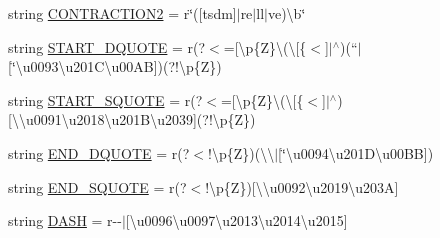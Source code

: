 \begin{DoxyCompactItemize}
\item 
string \hyperlink{classparlai_1_1agents_1_1tfidf__retriever_1_1tokenizers_1_1regexp__tokenizer_1_1RegexpTokenizer_ad05b6da0a1fa16547d923ec8571f4c3f}{C\+O\+N\+T\+R\+A\+C\+T\+I\+O\+N2} = r\char`\"{}\textquotesingle{}(\mbox{[}tsdm\mbox{]}$\vert$re$\vert$ll$\vert$ve)\textbackslash{}b\char`\"{}
\item 
string \hyperlink{classparlai_1_1agents_1_1tfidf__retriever_1_1tokenizers_1_1regexp__tokenizer_1_1RegexpTokenizer_a140d0978b3d372b2e028c674a3493648}{S\+T\+A\+R\+T\+\_\+\+D\+Q\+U\+O\+TE} = r\textquotesingle{}(?$<$=\mbox{[}\textbackslash{}p\{Z\}\textbackslash{}(\textbackslash{}\mbox{[}\{$<$\mbox{]}$\vert$$^\wedge$)(``$\vert$\mbox{[}\char`\"{}\textbackslash{}u0093\textbackslash{}u201\+C\textbackslash{}u00\+AB\mbox{]})(?!\textbackslash{}p\{Z\})\textquotesingle{}
\item 
string \hyperlink{classparlai_1_1agents_1_1tfidf__retriever_1_1tokenizers_1_1regexp__tokenizer_1_1RegexpTokenizer_a30cba2f9da5ba5742ba1f9b35ce36893}{S\+T\+A\+R\+T\+\_\+\+S\+Q\+U\+O\+TE} = r\textquotesingle{}(?$<$=\mbox{[}\textbackslash{}p\{Z\}\textbackslash{}(\textbackslash{}\mbox{[}\{$<$\mbox{]}$\vert$$^\wedge$)\mbox{[}\textbackslash{}\textquotesingle{}\textbackslash{}u0091\textbackslash{}u2018\textbackslash{}u201\+B\textbackslash{}u2039\mbox{]}(?!\textbackslash{}p\{Z\})\textquotesingle{}
\item 
string \hyperlink{classparlai_1_1agents_1_1tfidf__retriever_1_1tokenizers_1_1regexp__tokenizer_1_1RegexpTokenizer_a1a58c7d541115715ff456eade1f2e3a7}{E\+N\+D\+\_\+\+D\+Q\+U\+O\+TE} = r\textquotesingle{}(?$<$!\textbackslash{}p\{Z\})(\textbackslash{}\textquotesingle{}\textbackslash{}\textquotesingle{}$\vert$\mbox{[}\char`\"{}\textbackslash{}u0094\textbackslash{}u201\+D\textbackslash{}u00\+BB\mbox{]})\textquotesingle{}
\item 
string \hyperlink{classparlai_1_1agents_1_1tfidf__retriever_1_1tokenizers_1_1regexp__tokenizer_1_1RegexpTokenizer_a3cbf9243e192d07d2f1771b519c2f59f}{E\+N\+D\+\_\+\+S\+Q\+U\+O\+TE} = r\textquotesingle{}(?$<$!\textbackslash{}p\{Z\})\mbox{[}\textbackslash{}\textquotesingle{}\textbackslash{}u0092\textbackslash{}u2019\textbackslash{}u203A\mbox{]}\textquotesingle{}
\item 
string \hyperlink{classparlai_1_1agents_1_1tfidf__retriever_1_1tokenizers_1_1regexp__tokenizer_1_1RegexpTokenizer_aed62f4c76db328bd67d6576acf2377d7}{D\+A\+SH} = r\textquotesingle{}-\/-\/$\vert$\mbox{[}\textbackslash{}u0096\textbackslash{}u0097\textbackslash{}u2013\textbackslash{}u2014\textbackslash{}u2015\mbox{]}\textquotesingle{}

\end{DoxyCompactItemize}

